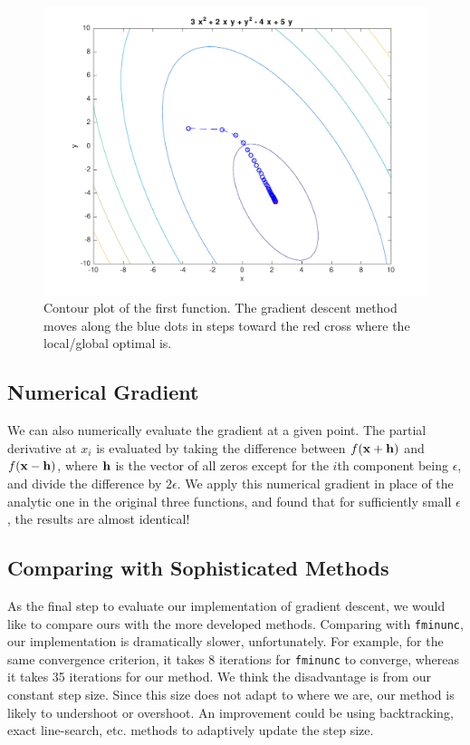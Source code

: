 \begin{figure}[h!]
\centering
\includegraphics[scale=0.4]{hw1_1.pdf}
\caption{Contour plot of the first function. The gradient descent method moves along the blue dots in steps toward the red cross where the local/global optimal is.}
\end{figure}


\subsection{Numerical Gradient}
We can also numerically evaluate the gradient at a given point. The partial derivative at $x_i$ is evaluated by taking the difference between $f(\boldsymbol{\mathbf{x}}+\boldsymbol{\mathbf{h}})$ and $f(\boldsymbol{\mathbf{x}}-\boldsymbol{\mathbf{h}})$, where $\boldsymbol{\mathbf{h}}$ is the vector of all zeros except for the $i$th component being $\epsilon$, and divide the difference by $2\epsilon$. We apply this numerical gradient in place of the analytic one in the original three functions, and found that for sufficiently small $\epsilon$, the results are almost identical!

\subsection{Comparing with Sophisticated Methods}
As the final step to evaluate our implementation of gradient descent, we would like to compare ours with the more developed methods. Comparing with \texttt{fminunc}, our implementation is dramatically slower, unfortunately. For example, for the same convergence criterion, it takes 8 iterations for \texttt{fminunc} to converge, whereas it takes 35 iterations for our method. We think the disadvantage is from our constant step size. Since this size does not adapt to where we are, our method is likely to undershoot or overshoot. An improvement could be using backtracking, exact line-search, etc. methods to adaptively update the step size.  